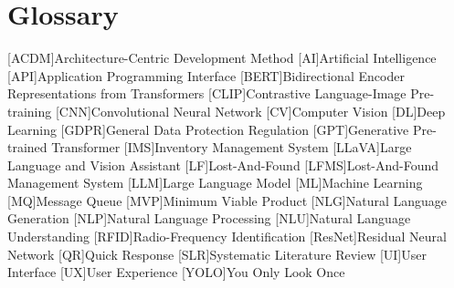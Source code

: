 \chapter{Glossary}

\footnotesize
\DoubleSpacing

\begin{multicols}{2}
\begin{acronym}[ai]
	[ACDM]{Architecture-Centric Development Method}
	[AI]{Artificial Intelligence}
	[API]{Application Programming Interface}
	[BERT]{Bidirectional Encoder Representations from Transformers}
	[CLIP]{Contrastive Language-Image Pre-training}
	[CNN]{Convolutional Neural Network}
	[CV]{Computer Vision}
	[DL]{Deep Learning}
	[GDPR]{General Data Protection Regulation}
	[GPT]{Generative Pre-trained Transformer}
	[IMS]{Inventory Management System}
	[LLaVA]{Large Language and Vision Assistant}
	[LF]{Lost-And-Found}
	[LFMS]{Lost-And-Found Management System}
	[LLM]{Large Language Model}
	[ML]{Machine Learning}
	[MQ]{Message Queue}
	[MVP]{Minimum Viable Product}
	[NLG]{Natural Language Generation}
	[NLP]{Natural Language Processing}
	[NLU]{Natural Language Understanding}
	[RFID]{Radio-Frequency Identification}
	[ResNet]{Residual Neural Network}
	[QR]{Quick Response}
	[SLR]{Systematic Literature Review}
	[UI]{User Interface}
	[UX]{User Experience}
	[YOLO]{You Only Look Once}
\end{acronym}
\end{multicols}

